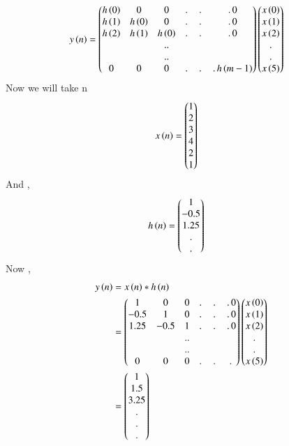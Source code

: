 \documentclass[journal,12pt,twocolumn]{IEEEtran}
\renewcommand\thesection{\arabic{section}}
\begin{document}
\begin{enumerate}[label=\thesection.\arabic*]
     \begin{align}
       y\left(n\right) &= \begin{pmatrix}h\left(0\right) & 0 & 0 &.\,&.\,&.\,0 \\
                           h\left(1\right) & h\left(0\right) & 0 & .\,&.\,&.\,0 \\
                           h\left(2\right) & h\left(1\right) & h\left(0\right) & .\,&.\,&.\,0 \\
                            &&..\\&&..\\ 0 & 0 &  0 &.\,&.\,&.\, h\left(m-1\right)\end{pmatrix}\begin{pmatrix}x\left(0\right)\\x\left(1\right)\\x\left(2\right)\\ . \\.\\x\left(5\right)\end{pmatrix}
     \end{align}
     Now  we will take n 
      \begin{align}
          x\left(n\right) &= \begin{pmatrix}1\\2\\3\\4\\2\\1\end{pmatrix}
      \end{align}
      And ,
      \begin{align} 
        h\left(n\right) &= \begin{pmatrix}1 \\ -0.5 \\ 1.25 \\. \\ . \end{pmatrix}
      \end{align}
     Now ,
      \begin{align}
        y\brak{n} &= x\brak{n}*h\brak{n}\\
                  &= \myvec{1 & 0 & 0 &.\,&.\,&.\,0 \\
                  -0.5 & 1 & 0 & .\,&.\,&.\,0 \\
                  1.25 & -0.5 & 1 & .\,&.\,&.\,0 \\
                   &&..\\&&..\\ 0 & 0 &  0 &.\,&.\,&.\, }\myvec{x\brak{0}\\x\brak{1}\\x\brak{2}\\ . \\.\\x\brak{5}} \\
                  &= \myvec{1\\1.5\\3.25\\.\\.\\.}

\end{align}
\end{enumerate}
\end{document}
